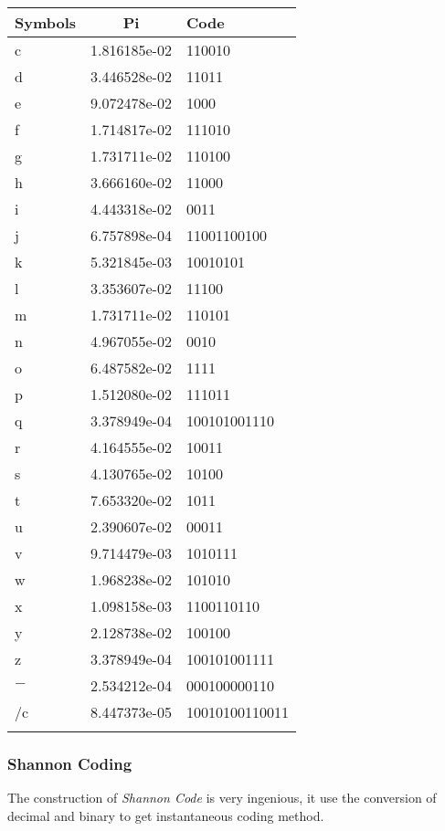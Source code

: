 \documentclass[12pt]{article} %
\numberwithin{equation}{section}
\def\cents{\hbox{\rm\rlap/c}}
\begin{document}
\begin{table}[hptb]
\begin{minipage}{.5\linewidth}
\begin{tabular}{lcl}  %
\hline
Symbols  &Pi 				 &Code\\   \hline
c 		 &1.816185e-02 		 &110010\\
d 		 &3.446528e-02 		 &11011\\
e 		 &9.072478e-02 		 &1000\\
f 		 &1.714817e-02 		 &111010\\
g 		 &1.731711e-02 		 &110100\\
h 		 &3.666160e-02 		 &11000\\
i 		 &4.443318e-02 		 &0011\\
j 		 &6.757898e-04 		 &11001100100\\
k 		 &5.321845e-03 		 &10010101\\
l 		 &3.353607e-02 		 &11100\\
m 		 &1.731711e-02 		 &110101\\
n 		 &4.967055e-02 		 &0010\\
o 		 &6.487582e-02 		 &1111\\
p 		 &1.512080e-02 		 &111011\\
q 		 &3.378949e-04 		 &100101001110\\
r 		 &4.164555e-02 		 &10011\\
s 		 &4.130765e-02 		 &10100\\
t 		 &7.653320e-02 		 &1011\\
u 		 &2.390607e-02 		 &00011\\
v 		 &9.714479e-03 		 &1010111\\
w 		 &1.968238e-02 		 &101010\\
x 		 &1.098158e-03 		 &1100110110\\
y 		 &2.128738e-02 		 &100100\\
z 		 &3.378949e-04 		 &100101001111\\
$-$      &2.534212e-04 		 &000100000110\\
\cents 	 &8.447373e-05 		 &10010100110011\\
\\ \hline
\end{tabular}
\end{minipage}
\end{table}


\subsubsection{Shannon Coding}

The construction of \emph{Shannon Code} is very ingenious, it use the conversion of decimal and binary to get instantaneous coding method.
\end{document}
